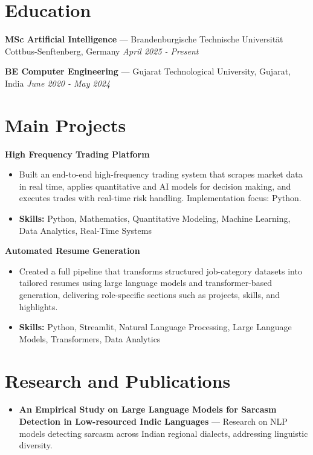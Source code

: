 \documentclass[a4paper,10pt]{article}
\begin{document}
\section*{Education}
\textbf{MSc Artificial Intelligence} — Brandenburgische Technische Universität Cottbus-Senftenberg, Germany \hfill \textit{April 2025 - Present}\par
\vspace{1.5pt}
\textbf{BE Computer Engineering} — Gujarat Technological University, Gujarat, India \hfill \textit{June 2020 - May 2024}\par

\section*{Main Projects}
\textbf{High Frequency Trading Platform}\par
\vspace{1pt}
\begin{itemize}
  \item Built an end-to-end high-frequency trading system that scrapes market data in real time, applies quantitative and AI models for decision making, and executes trades with real-time risk handling. Implementation focus: Python.
  \item \textbf{Skills:} Python, Mathematics, Quantitative Modeling, Machine Learning, Data Analytics, Real-Time Systems
\end{itemize}
\vspace{3pt}
\textbf{Automated Resume Generation}\par
\vspace{1pt}
\begin{itemize}
  \item Created a full pipeline that transforms structured job-category datasets into tailored resumes using large language models and transformer-based generation, delivering role-specific sections such as projects, skills, and highlights.
  \item \textbf{Skills:} Python, Streamlit, Natural Language Processing, Large Language Models, Transformers, Data Analytics
\end{itemize}

\section*{Research and Publications}
\begin{itemize}
\item \textbf{An Empirical Study on Large Language Models for Sarcasm Detection in Low-resourced Indic Languages} — Research on NLP models detecting sarcasm across Indian regional dialects, addressing linguistic diversity.
\end{itemize}
\end{document}
